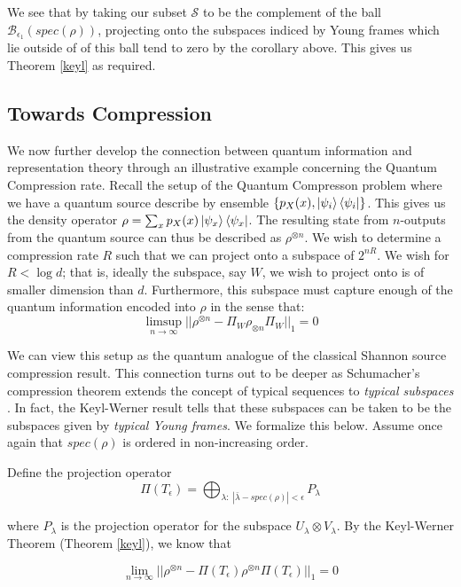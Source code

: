 \documentclass[12pt]{article}%
\begin{document}
\noindent We see that by taking our subset $\mathcal{S}$ to be the complement of the ball $\mathcal{B}_{\epsilon_1}(spec(\rho))$, projecting onto the subspaces indiced by Young frames which lie outside of of this ball tend to zero by the corollary above. This gives us Theorem \ref{keyl} as required.

\subsection{Towards Compression}
We now further develop the connection between quantum information and representation theory through an illustrative example concerning the Quantum Compression rate. Recall the setup of the Quantum Compresson problem where we have a quantum source describe by ensemble $\{p_X(x), \ket{\psi_i}\bra{\psi_i}\}$. This gives us the density operator $\rho = \sum_x p_X(x)\ket{\psi_x}\bra{\psi_x}$. The resulting state from $n$-outputs from the quantum source can thus be described as $\rho^{\otimes n}$. We wish to determine a compression rate $R$ such that we can project onto a subspace of $2^{nR}$. We wish for $R < \log{d}$; that is, ideally the subspace, say $W$, we wish to project onto is of smaller dimension than $d$. Furthermore, this subspace must capture enough of the quantum information encoded into $\rho$ in the sense that:
\begin{equation*}
  \limsup_{n \rightarrow \infty} || \rho^{\otimes n} - \Pi_{W}\rho_{\otimes n}\Pi_W ||_1 = 0
\end{equation*}

We can view this setup as the quantum analogue of the classical Shannon source compression result. This connection turns out to be deeper as Schumacher's compression theorem extends the concept of typical sequences to \textit{typical subspaces} \cite{sch}. In fact, the Keyl-Werner result tells that these subspaces can be taken to be the subspaces given by \textit{typical Young frames}. We formalize this below. Assume once again that $spec(\rho)$ is ordered in non-increasing order.

Define the projection operator $$ \Pi(T_{\epsilon}) = \bigoplus_{\lambda: \; |\bar{\lambda} - spec(\rho)| < \epsilon} P_{\lambda} $$

where $P_{\lambda}$ is the projection operator for the subspace $U_{\lambda} \otimes V_{\lambda}$. By the Keyl-Werner Theorem (Theorem \ref{keyl}), we know that

$$ \lim_{n \rightarrow \infty} ||\rho^{\otimes n} - \Pi(T_\epsilon) \rho^{\otimes n} \Pi(T_\epsilon) ||_1 = 0$$
\end{document}
